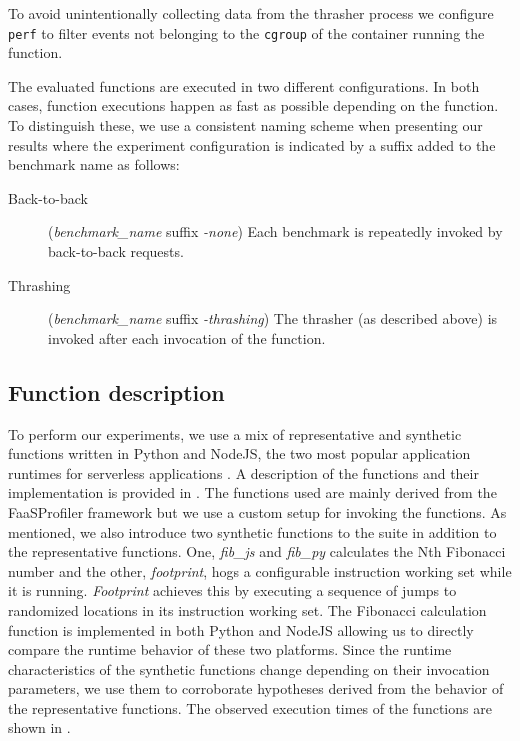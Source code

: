 To avoid unintentionally collecting data from the thrasher process we configure \texttt{perf} to filter events not belonging to the \texttt{cgroup} of the container running the function.

The evaluated functions are executed in two different configurations. In both cases, function executions happen as fast as possible depending on the function. To distinguish these, we use a consistent naming scheme when presenting our results where the experiment configuration is indicated by a suffix added to the benchmark name as follows:
\begin{description}
\item[Back-to-back]  (\textit{benchmark\_name} suffix \textit{-none}) Each benchmark is repeatedly invoked by back-to-back requests.
\item[Thrashing] (\textit{benchmark\_name} suffix \textit{-thrashing})  The thrasher (as described above) is invoked after each invocation of the function.
\end{description}


\subsection{Function description}
\label{wosc:subsec:work_desc}
To perform our experiments, we use a mix of representative and synthetic functions written in Python and NodeJS, the two most popular application runtimes for serverless applications \cite{serverless_state}. A description of the functions and their implementation is provided in . The functions used are mainly derived from the FaaSProfiler framework \cite{shahrad19_archit_implic_funct_servic_comput} but we use a custom setup for invoking the functions. As mentioned, we also introduce two synthetic functions to the suite in addition to the representative functions. One, \emph{fib\_js} and \emph{fib\_py} calculates the Nth Fibonacci number and the other, \emph{footprint}, hogs a configurable instruction working set while it is running. \emph{Footprint} achieves this by executing a sequence of jumps to randomized locations in its instruction working set. The Fibonacci calculation function is implemented in both Python and NodeJS allowing us to directly compare the runtime behavior of these two platforms. Since the runtime characteristics of the synthetic functions change depending on their invocation parameters, we use them to corroborate hypotheses derived from the behavior of the representative functions. The observed execution times of the functions are shown in .




